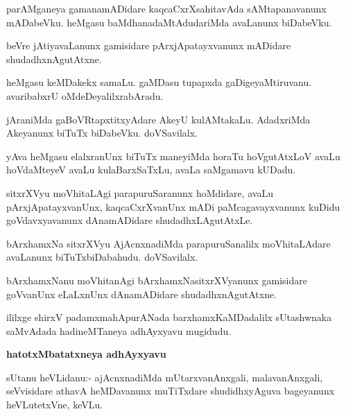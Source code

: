 \begin{mng}
parAMganeya gamanamADidare kaqcaCxrXsahitavAda sAMtapanavanunx mADabeVku. heMgasu baMdhanadaMtAdudariMda avaLanunx biDabeVku.
\end{mng}

\begin{mng}
beVre jAtiyavaLanunx gamisidare pArxjApatayxvanunx mADidare shudadhxnAgutAtxne.
\end{mng}

\begin{mng}
heMgasu keMDakekx samaLu. gaMDasu tupapxda gaDigeyaMtiruvanu. avaribabxrU oMdeDeyalilxrabAradu.
\end{mng}

\begin{mng}
jAraniMda gaBoVRtapxtitxyAdare AkeyU kulAMtakaLu. AdadxriMda Akeyanunx biTuTx biDabeVku. doVSavilalx.
\end{mng}

\begin{mng}
yAva heMgasu elalxranUnx biTuTx maneyiMda horaTu hoVgutAtxLoV avaLu hoVdaMteyeV avaLu kulaBarxSaTxLu, avaLa saMgamavu kUDadu.
\end{mng}

\begin{mng}
sitxrXVyu moVhitaLAgi parapuruSaranunx hoMdidare, avaLu pArxjApatayxvanUnx, kaqcaCxrXvanUnx mADi paMcagavayxvanunx kuDidu goVdavxyavanunx dAnamADidare shudadhxLAgutAtxLe.
\end{mng}

\begin{mng}
bArxhamxNa sitxrXVyu AjAcnxnadiMda parapuruSanalilx moVhitaLAdare avaLanunx biTuTxbiDabahudu. doVSavilalx.
\end{mng}

\begin{mng}
bArxhamxNanu moVhitanAgi bArxhamxNasitxrXVyanunx gamisidare goVvanUnx eLaLxnUnx dAnamADidare shudadhxnAgutAtxne.
\end{mng}
ililxge shirxV padamxmahApurANada barxhamxKaMDadalilx sUtashwnaka saMvAdada hadineMTaneya adhAyxyavu mugidudu.

\begin{center}
\textbf{\large hatotxMbatatxneya adhAyxyavu}
\end{center}

\begin{mng}
sUtanu heVLidanu:- ajAcnxnadiMda mUtarxvanAnxgali, malavanAnxgali, seVvisidare athavA heMDavanunx muTiTxdare shudidhxyAguva bageyanunx heVLutetxVne, keVLu.
\end{mng}

